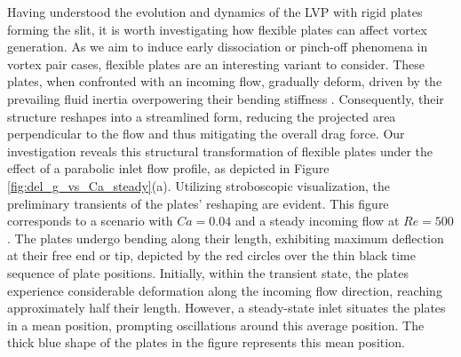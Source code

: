 \documentclass[final,3p,times,authoryear]{elsarticle}
\begin{document}
Having understood the evolution and dynamics of the LVP with rigid plates forming the slit, it is worth investigating how flexible plates can affect vortex generation. As we aim to induce early dissociation or pinch-off phenomena in vortex pair cases, flexible plates are an interesting variant to consider. These plates, when confronted with an incoming flow, gradually deform, driven by the prevailing fluid inertia overpowering their bending stiffness \citep{Shelley2011}. Consequently, their structure reshapes into a streamlined form, reducing the projected area perpendicular to the flow and thus mitigating the overall drag force. Our investigation reveals this structural transformation of flexible plates under the effect of a parabolic inlet flow profile, as depicted in Figure \ref{fig:del_g_vs_Ca_steady}(a). Utilizing stroboscopic visualization, the preliminary transients of the plates' reshaping are evident. This figure corresponds to a scenario with $Ca = 0.04$ and a steady incoming flow at $Re=500$. The plates undergo bending along their length, exhibiting maximum deflection at their free end or tip, depicted by the red circles over the thin black time sequence of plate positions. Initially, within the transient state, the plates experience considerable deformation along the incoming flow direction, reaching approximately half their length. However, a steady-state inlet situates the plates in a mean position, prompting oscillations around this average position. The thick blue shape of the plates in the figure represents this mean position.
\end{document}
